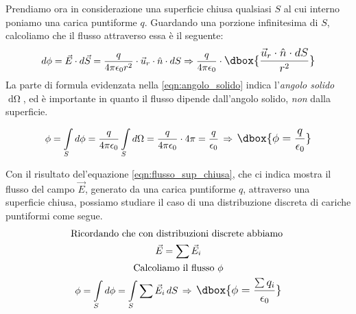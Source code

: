 \documentclass[a4paper,12pt,titlepage,openany]{book}
\theoremstyle{mydef}
\newcommand\dboxed[1]{\mathlarger{\dbox{\ensuremath{#1}}}}  %
\begin{document}
            \noindent
            Prendiamo ora in considerazione una superficie chiusa qualsiasi $S$ al cui interno poniamo una
            carica puntiforme $q$. Guardando una porzione infinitesima di $S$, calcoliamo che
            il flusso attraverso essa è il seguente:
            \begin{equation}\label{eqn:angolo_solido}
                \mathop{d\phi} = \vec{E}\cdot\mathop{d\vec{S}} =
                \frac{q}{4\pi\epsilon_0r^2}\cdot\vec{u}_r\cdot\hat{n}\cdot\mathop{dS} \Rightarrow
                \frac{q}{4\pi\epsilon_0}\cdot
                \dboxed{\frac{\vec{u}_r\cdot\hat{n}\cdot\mathop{dS}}{r^2}}
            \end{equation}
            La parte di formula evidenzata nella \ref{eqn:angolo_solido} indica l'\emph{angolo solido}
            $\mathop{d\Omega}$, ed è importante in quanto il flusso dipende dall'angolo solido,
            \emph{non} dalla superficie.
            
            \begin{equation}\label{eqn:flusso_sup_chiusa}
                \phi = \int\limits_S \mathop{d\phi} = \frac{q}{4\pi\epsilon_0}\int\limits_S\mathop{d\Omega} = \frac{q}{4\pi\epsilon_0}\cdot 4\pi = \frac{q}{\epsilon_0}
                \,\Rightarrow\,\dboxed{\phi=\frac{q}{\epsilon_0}}
            \end{equation}
            
            Con il risultato del'equazione \ref{eqn:flusso_sup_chiusa}, che ci indica mostra il flusso del campo $\vec{E}$, generato da una carica puntiforme $q$, attraverso
            una superficie chiusa, possiamo studiare il caso di una distribuzione discreta di cariche puntiformi come segue.
            \begin{gather*}
                \text{Ricordando che con distribuzioni discrete abbiamo }\\
                \vec{E} = \sum\vec{E}_i\\
                \text{Calcoliamo il flusso }\phi\\
                \phi = \int\limits_S\mathop{d\phi} = \int\limits_S\sum\vec{E}_i\mathop{dS} \,\Rightarrow\, \dboxed{\phi=\frac{\sum q_i}{\epsilon_0}}
            \end{gather*}
            
\end{document}
